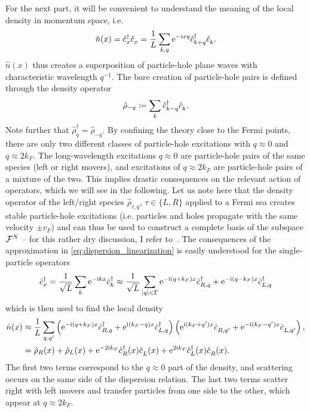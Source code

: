 For the next part, it will be convenient to understand the meaning of the local density in momentum space, i.e.
\begin{align}
    \hat n(x) = \hat c^\dag_x \hat c^\pdag_x = \frac1L\sum_{k,q}\re^{-\ri x q}\hat c^\dag_{k+q}\hat c^\pdag_{k}.
    \label{eq:local_density}
\end{align}
$\hat n(x)$ thus creates a superposition of particle-hole plane waves with characteristic wavelength $q^{-1}$.
The bare creation of particle-hole pairs is defined through the density operator
\begin{align}
    \hat \rho_{-q}\coloneqq \sum_k \hat c^\dag_{k-q}\hat c^\pdag_{k}.
\end{align}
Note further that $\hat\rho_q^\dag = \hat\rho_{-q}$.
By confining the theory close to the Fermi points, there are only two different classes of particle-hole excitations with $q\approx 0$ and $q\approx2k_F$.
The long-wavelength excitations $q\approx0$ are particle-hole pairs of the same species (left or right movers), and excitations of $q\approx2k_F$ are particle-hole pairs of a mixture of the two.
This implies drastic consequences on the relevant action of operators, which we will see in the following.
Let us note here that the density operator of the left/right species $\hat\rho_{\tau,q}$, $\tau\in\{L,R\}$ applied to a Fermi sea creates stable particle-hole excitations (i.e. particles and holes propagate with the same velocity $\pm v_F$) and can thus be used to construct a complete basis of the subspace $\mathcal{F}^N$ -- for this rather dry discussion, I refer to~\cite{vonDelft1998}.
The consequences of the approximation in \cref{eq:dispersion_linearization} is easily understood for the single-particle operators
\begin{align}
    \hat c^\dag_x = \frac1{\sqrt L}\sum_k \mathrm e^{-\mathrm i k x}\hat c^\dag_k \approx \frac1{\sqrt L}\sum_{|q|<\Gamma}\mathrm e^{-\mathrm i (q+k_F) x}\hat c^\dag_{R, q} + \mathrm e^{-\mathrm i (q-k_F) x}\hat c^\dag_{L, q}
    \label{eq:confinement_creation_annihilation}
\end{align}
which is then used to find the local density
\begin{align}
    \hat n(x)
    &\approx \frac1L\sum_{q,q'}\brlr{\re^{-\ri (q+k_F) x}\hat c^\dag_{R, q} + \re^{\ri (k_F-q) x}\hat c^\dag_{L, q}}\brlr{\re^{\ri (k_F+q') x}\hat c^\pdag_{R, q'} + \re^{-\ri (k_F-q') x}\hat c^\pdag_{L, q'}},
    \\
    &= \hat \rho_R(x) + \hat \rho_L(x) + \re^{-2\ri k_F}\hat c^\dag_{R}(x)\hat c^\pdag_{L}(x) + \re^{2\ri k_F}\hat c^\dag_{L}(x)\hat c^\pdag_{R}(x).
    \label{eq:local_density_approximation}
\end{align}
The first two terms correspond to the $q\approx0$ part of the density, and scattering occurs on the same side of the dispersion relation.
The last two terms scatter right with left movers and transfer particles from one side to the other, which appear at $q\approx2k_F$.

